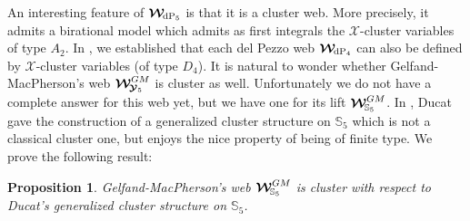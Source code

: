 \documentclass[11pt]{amsart}
\newtheorem{prop}[thm]{Proposition}
\begin{document}
An interesting feature of $\boldsymbol{\mathcal W}_{  \hspace{-0.05cm} {\rm dP}_5}$ is that it is a cluster web. More precisely, it admits a birational model which admits as first integrals the $\mathcal X$-cluster variables of type $A_2$. In \cite{PirioAFST}, we established that each del Pezzo web  $\boldsymbol{\mathcal W}_{  \hspace{-0.05cm} {\rm dP}_4}$ can also be defined by 
$\mathcal X$-cluster variables (of type $D_4$). It is natural to wonder whether Gelfand-MacPherson's web  $\boldsymbol{\mathcal W}^{GM}_{ \hspace{-0.05cm}
\boldsymbol{\mathcal Y}_5}$ is cluster as well.  Unfortunately we do not have a complete answer for this web yet, but we have one for its lift $\boldsymbol{\mathcal W}^{GM}_{ \hspace{-0.05cm}
{\mathbb S}_5}$.  
In \cite{Ducat},  Ducat gave the construction of a generalized cluster structure on $\mathbb S_5$ which is not a classical cluster one, but enjoys the nice property of being of finite type. 
We prove the following result: 
\begin{prop}
Gelfand-MacPherson's web 
$\boldsymbol{\mathcal W}^{GM}_{ \hspace{-0.05cm}
{\mathbb S}_5}$ is cluster with respect to Ducat's generalized cluster structure on $\mathbb S_5$.
\end{prop}

%
%
%
\end{document}
